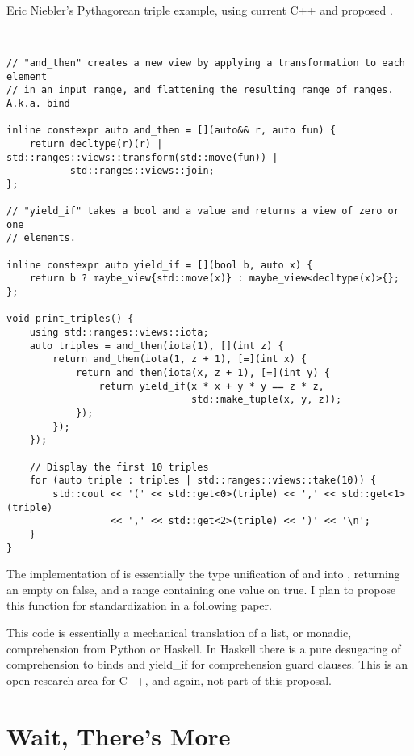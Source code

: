 \documentclass[a4paper,10pt,oneside,openany,final,article]{memoir}
\begin{document}
Eric Niebler's Pythagorean triple example, using current C++ and proposed .

\begin{minipage}[t]{\columnwidth}
  \begin{verbatim}


// "and_then" creates a new view by applying a transformation to each element
// in an input range, and flattening the resulting range of ranges. A.k.a. bind

inline constexpr auto and_then = [](auto&& r, auto fun) {
    return decltype(r)(r) | std::ranges::views::transform(std::move(fun)) |
           std::ranges::views::join;
};

// "yield_if" takes a bool and a value and returns a view of zero or one
// elements.

inline constexpr auto yield_if = [](bool b, auto x) {
    return b ? maybe_view{std::move(x)} : maybe_view<decltype(x)>{};
};

void print_triples() {
    using std::ranges::views::iota;
    auto triples = and_then(iota(1), [](int z) {
        return and_then(iota(1, z + 1), [=](int x) {
            return and_then(iota(x, z + 1), [=](int y) {
                return yield_if(x * x + y * y == z * z,
                                std::make_tuple(x, y, z));
            });
        });
    });

    // Display the first 10 triples
    for (auto triple : triples | std::ranges::views::take(10)) {
        std::cout << '(' << std::get<0>(triple) << ',' << std::get<1>(triple)
                  << ',' << std::get<2>(triple) << ')' << '\n';
    }
}

\end{verbatim}
\end{minipage}

The implementation of  is essentially the type unification of  and  into , returning an empty on false, and a range containing one value on true. I plan to propose this function for standardization in a following paper.

This code is essentially a mechanical translation of a list, or monadic, comprehension from Python or Haskell. In Haskell there is a pure desugaring of comprehension to binds and yield_if for comprehension guard clauses. This is an open research area for C++, and again, not part of this proposal.

\chapter{Wait, There's More}
\end{document}
